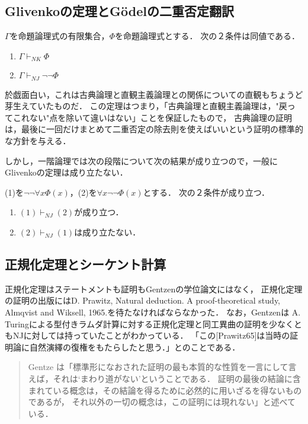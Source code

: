 \documentclass[uplatex, 12pt, dvipdfmx]{jsreport}
\begin{document}
\subsection{Glivenkoの定理とGödelの二重否定翻訳}

\begin{theorem}
    $\Gamma$を命題論理式の有限集合，$\Phi$を命題論理式とする．
    次の２条件は同値である．
    \begin{enumerate}
        \item $\Gamma\vdash_{NK}\Phi$
        \item $\Gamma\vdash_{NJ}\lnot\lnot\Phi$
    \end{enumerate}
\end{theorem}
\begin{remark}
    於戯面白い，これは古典論理と直観主義論理との関係についての直観もちょうど芽生えていたものだ．
    この定理はつまり，「古典論理と直観主義論理は，"戻ってこれない"点を除いて違いはない」ことを保証したもので，
    古典論理の証明は，最後に一回だけまとめて二重否定の除去則を使えばいいという証明の標準的な方針を与える．
\end{remark}

しかし，一階論理では次の段階について次の結果が成り立つので，一般にGlivenkoの定理は成り立たない．
\begin{proposition}[クリプキモデル]
    (1)を$\lnot\lnot\forall x\Phi(x)$，(2)を$\forall x\lnot\lnot\Phi(x)$とする．
    次の２条件が成り立つ．
    \begin{enumerate}
        \item $(1)\vdash_{NJ} (2)$が成り立つ．
        \item $(2)\vdash_{NJ} (1)$は成り立たない．
    \end{enumerate}
\end{proposition}

\subsection{正規化定理とシーケント計算}
正規化定理はステートメントも証明もGentzenの学位論文にはなく，
正規化定理の証明の出版にはD. Prawitz, Natural deduction. A proof-theoretical study, Almqvist and Wiksell, 1965.を待たなければならなかった．
なお，Gentzenは A. Turingによる型付きラムダ計算に対する正規化定理と同工異曲の証明を少なくともNJに対しては持っていたことがわかっている．
「この[Prawitz65]は当時の証明論に自然演繹の復権をもたらしたと思う．」とのことである\cite{新井敏康-Gentzen}．
\begin{quote}
    Gentze は「標準形になおされた証明の最も本質的な性質を一言にして言えば，それは‘まわり道がない’ということである．
    証明の最後の結論に含まれている概念は，その結論を得るために必然的に用いざるを得ないものであるが，
    それ以外の一切の概念は，この証明には現れない」と述べている．\cite{新井敏康-Gentzen}
\end{quote}
\end{document}
